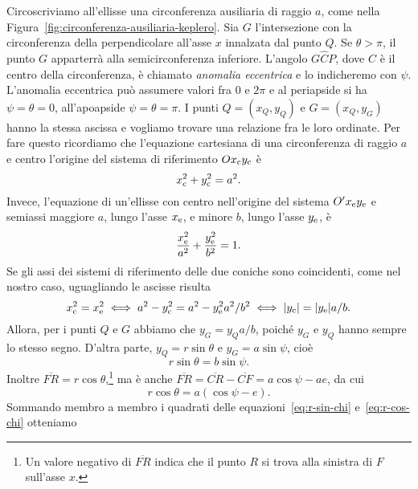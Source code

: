 Circoscriviamo all'ellisse una circonferenza ausiliaria di raggio $a$, come
nella Figura~\ref{fig:circonferenza-ausiliaria-keplero}. Sia $G$ l'intersezione
con la circonferenza della perpendicolare all'asse $x$ innalzata dal punto
$Q$. Se $\theta > \pi$, il punto $G$ apparterrà alla semicirconferenza
inferiore. L'angolo $G\widehat{C}P$, dove $C$ è il centro della circonferenza, è
chiamato \emph{anomalia eccentrica} e lo indicheremo con $\psi$. L'anomalia
eccentrica può assumere valori fra $0$ e $2\pi$ e al periapside si ha
$\psi = \theta = 0$, all'apoapside $\psi = \theta = \pi$. I punti $Q=(x_Q,y_Q)$
e $G=(x_Q,y_G)$ hanno la stessa ascissa e vogliamo trovare una relazione fra le
loro ordinate. Per fare questo ricordiamo che l'equazione cartesiana di una
circonferenza di raggio $a$ e centro l'origine del sistema di riferimento
$Ox_\textup{c}y_\textup{c}$ è
\begin{equation}
  x_\textup{c}^2 + y_\textup{c}^2 = a^2.
\end{equation}
Invece, l'equazione di un'ellisse con centro nell'origine del sistema
$O'x_\textup{e}y_\textup{e}$ e semiassi maggiore $a$, lungo l'asse
$x_\textup{e}$, e minore $b$, lungo l'asse $y_\textup{e}$, è
\begin{equation}
    \frac{x_\textup{e}^2}{a^2} + \frac{y_\textup{e}^2}{b^2} = 1.
\end{equation}
Se gli assi dei sistemi di riferimento delle due coniche sono coincidenti, come
nel nostro caso, uguagliando le ascisse risulta
\begin{equation}
  x_\textup{c}^2 = x_\textup{e}^2 \iff a^2 - y_\textup{c}^2 = a^2 -
  y_\textup{e}^2a^2/b^2 \iff \lvert y_\textup{c}\rvert = \lvert y_\textup{e}\rvert a/b.
\end{equation}
Allora, per i punti $Q$ e $G$ abbiamo che $y_G = y_Qa/b$, poiché $y_G$ e $y_Q$
hanno sempre lo stesso segno. D'altra parte, $y_Q = r\sin\theta$ e
$y_G = a\sin\psi$, cioè
\begin{equation}
  \label{eq:r-sin-chi}
  r\sin\theta = b\sin\psi.
\end{equation}
Inoltre $\overline{FR} =
r\cos\theta$,\footnote{Un
  valore negativo di $\overline{FR}$ indica che il punto $R$ si trova alla
  sinistra di $F$ sull'asse $x$.} ma è anche $\overline{FR} = \overline{CR} -
\overline{CF} = a\cos\psi - ae$, da cui
\begin{equation}
  \label{eq:r-cos-chi}
  r\cos\theta = a(\cos\psi - e).
\end{equation}
Sommando membro a membro i quadrati delle equazioni~\eqref{eq:r-sin-chi}
e~\eqref{eq:r-cos-chi} otteniamo
